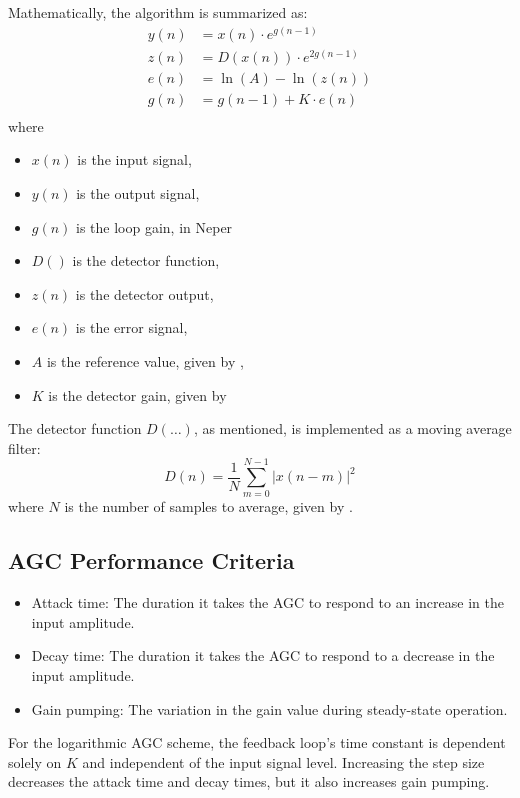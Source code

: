 Mathematically, the algorithm is summarized as:
\begin{align}
y(n) & = x(n)\cdot e^{g(n-1)}\\
z(n) & = D(x(n))\cdot e^{2g(n-1)}\\
e(n) & = \ln(A)-\ln(z(n))\\
g(n) & = g(n-1)+K\cdot e(n)\\
\end{align}
where
\begin{itemize}
  \item $x(n)$ is the input signal,
  \item $y(n)$ is the output signal,
  \item $g(n)$ is the loop gain, in Neper
  \item $D()$ is the detector function,
  \item $z(n)$ is the detector output,
  \item $e(n)$ is the error signal,
  \item $A$ is the reference value, given by ,
  \item $K$ is the detector gain, given by 
\end{itemize}

The detector function $D(\ldots)$, as mentioned, is implemented as a moving average filter:
\begin{equation}D(n)=\frac{1}{N}\sum_{m=0}^{N-1}|x(n-m)|^2\end{equation}
where $N$ is the number of samples to average, given by .

\subsection{AGC Performance Criteria}

\begin{itemize}
  \item Attack time: The duration it takes the AGC to respond to an increase in the input amplitude.
  \item Decay time: The duration it takes the AGC to respond to a decrease in the input amplitude.
  \item Gain pumping: The variation in the gain value during steady-state operation.
\end{itemize}

For the logarithmic AGC scheme, the feedback loop's time constant is dependent solely on $K$ and independent of the input signal level. Increasing the step size decreases the attack time and decay times, but it also increases gain pumping.

